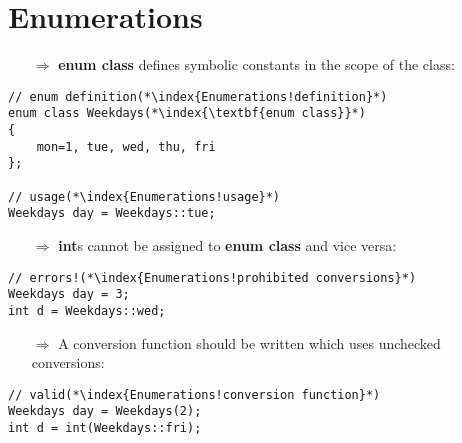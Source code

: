 \documentclass[10pt]{article}
\begin{document}
\section{Enumerations}
\small
\begin{enumerate}
\item[$\Rightarrow$] \textbf{enum class} defines symbolic constants in the scope of the class:
\end{enumerate}
\begin{lstlisting}
// enum definition(*\index{Enumerations!definition}*)
enum class Weekdays(*\index{\textbf{enum class}}*)
{
    mon=1, tue, wed, thu, fri
};

// usage(*\index{Enumerations!usage}*)
Weekdays day = Weekdays::tue;
\end{lstlisting}
\begin{enumerate}
\item[$\Rightarrow$] \textbf{int}s cannot be assigned to \textbf{enum class} and vice versa:
\end{enumerate}
\begin{lstlisting}
// errors!(*\index{Enumerations!prohibited conversions}*)
Weekdays day = 3;
int d = Weekdays::wed;
\end{lstlisting}
\begin{enumerate}
\item[$\Rightarrow$] A conversion function should be written which uses unchecked conversions:
\end{enumerate}
\begin{lstlisting}
// valid(*\index{Enumerations!conversion function}*)
Weekdays day = Weekdays(2);
int d = int(Weekdays::fri);
\end{lstlisting}
%
%
\end{document}
